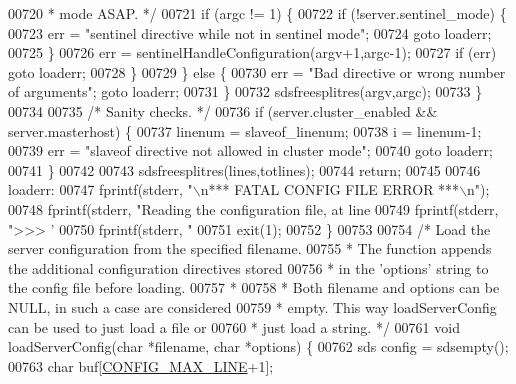 \begin{DoxyCode}
{{00720 \textcolor{comment}{             * mode ASAP. */}
00721             \textcolor{keywordflow}{if} (argc != 1) \{
00722                 \textcolor{keywordflow}{if} (!server.sentinel\_mode) \{
00723                     err = \textcolor{stringliteral}{"sentinel directive while not in sentinel mode"};
00724                     \textcolor{keywordflow}{goto} loaderr;
00725                 \}
00726                 err = sentinelHandleConfiguration(argv+1,argc-1);
00727                 \textcolor{keywordflow}{if} (err) \textcolor{keywordflow}{goto} loaderr;
00728             \}
00729         \} \textcolor{keywordflow}{else} \{
00730             err = \textcolor{stringliteral}{"Bad directive or wrong number of arguments"}; \textcolor{keywordflow}{goto} loaderr;
00731         \}
00732         sdsfreesplitres(argv,argc);
00733     \}
00734 
00735     \textcolor{comment}{/* Sanity checks. */}
00736     \textcolor{keywordflow}{if} (server.cluster\_enabled && server.masterhost) \{
00737         linenum = slaveof\_linenum;
00738         i = linenum-1;
00739         err = \textcolor{stringliteral}{"slaveof directive not allowed in cluster mode"};
00740         \textcolor{keywordflow}{goto} loaderr;
00741     \}
00742 
00743     sdsfreesplitres(lines,totlines);
00744     \textcolor{keywordflow}{return};
00745 
00746 loaderr:
00747     fprintf(stderr, \textcolor{stringliteral}{"\(\backslash\)n*** FATAL CONFIG FILE ERROR ***\(\backslash\)n"});
00748     fprintf(stderr, \textcolor{stringliteral}{"Reading the configuration file, at line %
00749     fprintf(stderr, \textcolor{stringliteral}{">>> '%
00750     fprintf(stderr, \textcolor{stringliteral}{"%
00751     exit(1);
00752 \}
00753 
00754 \textcolor{comment}{/* Load the server configuration from the specified filename.}
00755 \textcolor{comment}{ * The function appends the additional configuration directives stored}
00756 \textcolor{comment}{ * in the 'options' string to the config file before loading.}
00757 \textcolor{comment}{ *}
00758 \textcolor{comment}{ * Both filename and options can be NULL, in such a case are considered}
00759 \textcolor{comment}{ * empty. This way loadServerConfig can be used to just load a file or}
00760 \textcolor{comment}{ * just load a string. */}
00761 \textcolor{keywordtype}{void} loadServerConfig(\textcolor{keywordtype}{char} *filename, \textcolor{keywordtype}{char} *options) \{
00762     sds config = sdsempty();
00763     \textcolor{keywordtype}{char} buf[\hyperlink{server_8h_a0d8887ba7f096f153f904f206986a9fc}{CONFIG\_MAX\_LINE}+1];
}}}}}
\end{DoxyCode}
